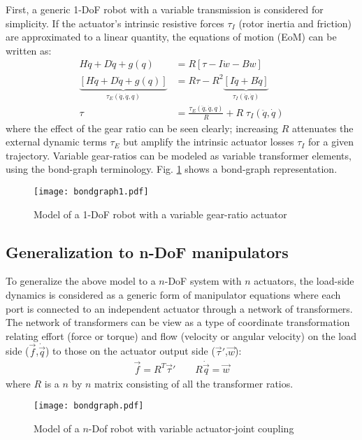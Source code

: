First, a generic 1-DoF robot with a variable transmission is considered for simplicity. If the actuator's intrinsic resistive forces $\tau_I$ (rotor inertia and friction) are approximated to a linear quantity, the equations of motion (EoM) can be written as:
%
\begin{align}
  H \ddot{q} + D \dot{q} + g( q )	&= R  \left[ \tau - I \dot{w} - B w	\right] \\
	\underbrace{\left[	H \ddot{q} + D \dot{q} + g( q )	\right]}_{\tau_{E}(\ddot{q},\dot{q},q)}
	&= R \tau - R^2
	\underbrace{\left[ I \ddot{q} + B \dot{q}	\right]}_{\tau_{I}(\ddot{q},\dot{q})} \\
	\tau &= 	\frac{\tau_{E}(\ddot{q},\dot{q},q)}{R} + R \; \tau_{I}(\ddot{q},\dot{q})
	\label{eq:1dofEoM}
\end{align}
%
where the effect of the gear ratio can be seen clearly; increasing $R$ attenuates the external dynamic terms $\tau_{E}$ but amplify the intrinsic actuator losses $\tau_{I}$ for a given trajectory.
%
Variable gear-ratios can be modeled as variable transformer elements, using the bond-graph terminology. Fig. \ref{fig:bondgraph1} shows a bond-graph representation.
%
\begin{figure}[htp]
	\centering
		\texttt{[image: bondgraph1.pdf]}
	\caption{Model of a 1-DoF robot with a variable gear-ratio actuator}
	\label{fig:bondgraph1}
\end{figure}


\subsection{Generalization to n-DoF manipulators}
\label{sec:GeneralizationToNDOFManipulators}

To generalize the above model to a $n$-DoF system with $n$ actuators, the load-side dynamics is considered as a generic form of manipulator equations where each port is connected to an independent actuator through a network of transformers. The network of transformers can be view as a type of coordinate transformation relating effort (force or torque) and flow (velocity or angular velocity) on the load side ($\vec{f}$,$\dot{\vec{q}}$) to those on the actuator output side ($\vec{\tau}'$,$\vec{w}$):
%
\begin{align}
	\vec{ f } = R^T \vec{\tau}' \quad  \quad R \dot{ \vec{q} } = \vec{w}
 \label{eq:coortransform}
\end{align}
%
where $R$ is a $n$ by $n$ matrix consisting of all the transformer ratios. 
%
\begin{figure}[htp]
	\centering
		\texttt{[image: bondgraph.pdf]}
	\caption{Model of a $n$-Dof robot with variable actuator-joint coupling}
	\label{fig:bondgraph}
\end{figure}

